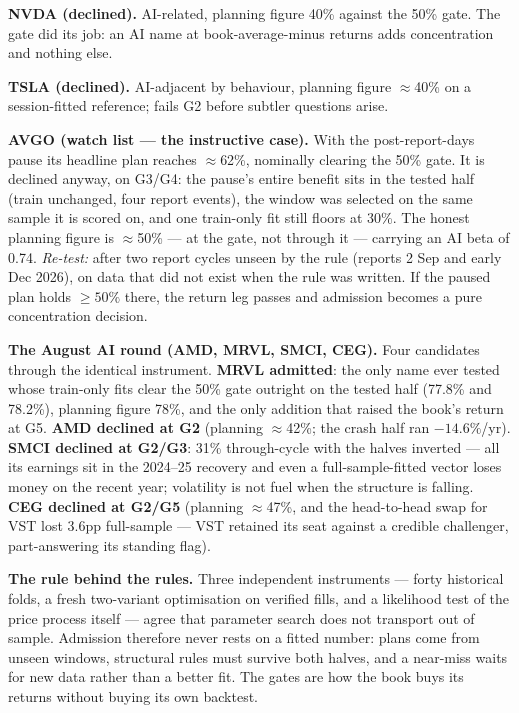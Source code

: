 \documentclass[11pt,a4paper]{article}
\begin{document}
\textbf{NVDA (declined).} AI-related, planning figure 40\% against the 50\% gate.
The gate did its job: an AI name at book-average-minus returns adds concentration
and nothing else.

\textbf{TSLA (declined).} AI-adjacent by behaviour, planning figure $\approx$40\%
on a session-fitted reference; fails G2 before subtler questions arise.

\textbf{AVGO (watch list --- the instructive case).} With the post-report-days
pause its headline plan reaches $\approx$62\%, nominally clearing the 50\% gate.
It is declined anyway, on G3/G4: the pause's entire benefit sits in the tested
half (train unchanged, four report events), the window was selected on the same
sample it is scored on, and one train-only fit still floors at 30\%. The honest
planning figure is $\approx$50\% --- at the gate, not through it --- carrying an
AI beta of 0.74. \emph{Re-test:} after two report cycles unseen by the rule
(reports 2 Sep and early Dec 2026), on data that did not exist when the rule was
written. If the paused plan holds $\geq 50\%$ there, the return leg passes and
admission becomes a pure concentration decision.

\textbf{The August AI round (AMD, MRVL, SMCI, CEG).} Four candidates through the
identical instrument. \textbf{MRVL admitted}: the only name ever tested whose
train-only fits clear the 50\% gate outright on the tested half (77.8\% and
78.2\%), planning figure 78\%, and the only addition that raised the book's
return at G5. \textbf{AMD declined at G2} (planning $\approx$42\%; the crash half
ran $-14.6\%$/yr). \textbf{SMCI declined at G2/G3}: 31\% through-cycle with the
halves inverted --- all its earnings sit in the 2024--25 recovery and even a
full-sample-fitted vector loses money on the recent year; volatility is not fuel
when the structure is falling. \textbf{CEG declined at G2/G5} (planning
$\approx$47\%, and the head-to-head swap for VST lost 3.6pp full-sample --- VST
retained its seat against a credible challenger, part-answering its standing
flag).

\begin{tcolorbox}[colback=bcteal!6,colframe=bcteal,boxrule=0.8pt,arc=1.5pt,
  left=8pt,right=8pt,top=6pt,bottom=6pt]
\textbf{The rule behind the rules.} Three independent instruments --- forty
historical folds, a fresh two-variant optimisation on verified fills, and a
likelihood test of the price process itself --- agree that parameter search does
not transport out of sample. Admission therefore never rests on a fitted number:
plans come from unseen windows, structural rules must survive both halves, and a
near-miss waits for new data rather than a better fit. The gates are how the book
buys its returns without buying its own backtest.
\end{tcolorbox}
\end{document}
